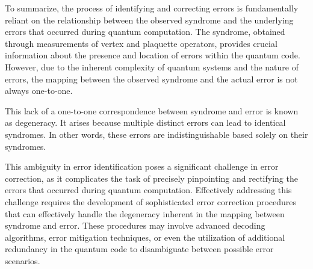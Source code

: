 \documentclass[12pt]{report}
\begin{document}
\begin{minipage}{1 \textwidth}
		
		
	\end{minipage}
	
	\begin{minipage}{1 \textwidth}
		
		
		To summarize, the process of identifying and correcting errors is fundamentally reliant on the relationship between the observed syndrome and the underlying errors that occurred during quantum computation. 
		The syndrome, obtained through measurements of vertex and plaquette operators, provides crucial information about the presence and location of errors within the quantum code. However, due to the inherent complexity of quantum systems and the nature of errors, the mapping between the observed syndrome and the actual error is not always one-to-one. \newline
		
		This lack of a one-to-one correspondence between syndrome and error is known as degeneracy. It arises because multiple distinct errors can lead to identical syndromes. In other words, these errors are indistinguishable based solely on their syndromes. \newline
		
		
		This ambiguity in error identification poses a significant challenge in error correction, as it complicates the task of precisely pinpointing and rectifying the errors that occurred during quantum computation. Effectively addressing this challenge requires the development of sophisticated error correction procedures that can effectively handle the degeneracy inherent in the mapping between syndrome and error. These procedures may involve advanced decoding algorithms, error mitigation techniques, or even the utilization of additional redundancy in the quantum code to disambiguate between possible error scenarios. \newline
		

\end{minipage}
\end{document}
